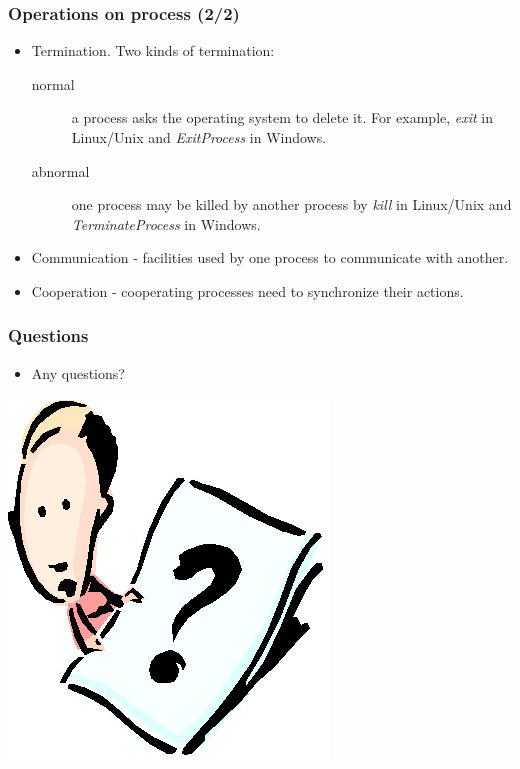 \documentclass[CJKutf8,xcolor=pdftex,dvipsnames,table]{beamer}
\begin{document}
\begin{CJK*}{UTF8}{song}
  \begin{frame}
  \frametitle{Operations on process (2/2)} \pause
  \begin{itemize}
  \item{Termination. \pause Two kinds of termination:} \pause
    \begin{description}
    \item[normal]{a process asks the operating system to delete it. For example, \emph{exit} in Linux/Unix and \emph{ExitProcess} in Windows.} \pause
    \item[abnormal]{one process may be killed by another process by \emph{kill} in Linux/Unix and \emph{TerminateProcess} in Windows.} \pause
    \end{description}
  \item{Communication \pause - facilities used by one process to communicate with another.} \pause
  \item{Cooperation \pause - cooperating processes need to synchronize their actions.}
  \end{itemize}
  \end{frame}

  \begin{frame}
  \frametitle{Questions}
  \begin{itemize}
  \item{Any questions?}
  \end{itemize}
  \begin{center}
    \includegraphics[scale=.5]{question}
  \end{center}
  \end{frame}


\end{CJK*}
\end{document}
